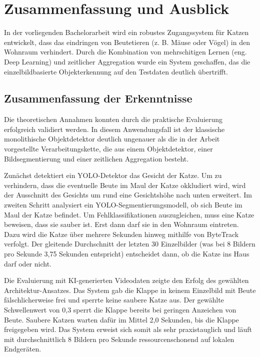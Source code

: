 \chapter{Zusammenfassung und Ausblick}
\label{sec:zusammenfassung}

In der vorliegenden Bachelorarbeit wird ein robustes Zugangssystem für Katzen entwickelt, dass das eindringen von Beutetieren (z. B. Mäuse oder Vögel) in den Wohnraum verhindert. Durch die Kombination von mehrschitigen Lernen (eng. Deep Learning) und zeitlicher Aggregation wurde ein System geschaffen, das die einzelbildbasierte Objekterkennung auf den Testdaten deutlich übertrifft.

\section{Zusammenfassung der Erkenntnisse}
\label{subsec:zusammenfassung_erkenntnisse}

Die theoretischen Annahmen konnten durch die praktische Evaluierung erfolgreich validiert werden. In diesem Anwendungsfall ist der klassische monolithische Objektdetektor deutlich ungenauer als die in der Arbeit vorgestellte Verarbeitungskette, die aus einem Objektdetektor, einer Bildsegmentierung und einer zeitlichen Aggregation besteht.

Zunächst detektiert ein YOLO-Detektor das Gesicht der Katze. Um zu verhindern, dass die eventuelle Beute im Maul der Katze okkludiert wird, wird der Ausschnitt des Gesichts um rund eine Gesichtshöhe nach unten erweitert. Im zweiten Schritt analysiert ein YOLO-Segmentierungsmodell, ob sich Beute im Maul der Katze befindet. Um Fehlklassifikationen auszugleichen, muss eine Katze beweisen, dass sie sauber ist. Erst dann darf sie in den Wohnraum eintreten. Dazu wird die Katze über mehrere Sekunden hinweg mithilfe von ByteTrack verfolgt. Der gleitende Durchschnitt der letzten 30 Einzelbilder (was bei 8 Bildern pro Sekunde 3,75 Sekunden entspricht) entscheidet dann, ob die Katze ins Haus darf oder nicht.

Die Evaluierung mit KI-generierten Videodaten zeigte den Erfolg des gewählten Architektur-Ansatzes. Das System gab die Klappe in keinem Einzelbild mit Beute fälschlicherweise frei und sperrte keine saubere Katze aus. Der gewählte Schwellenwert von 0,3 sperrt die Klappe bereits bei geringen Anzeichen von Beute. Saubere Katzen warten dafür im Mittel 2,0 Sekunden, bis die Klappe freigegeben wird. Das System erweist sich somit als sehr praxistauglich und läuft mit durchschnittlich 8 Bildern pro Sekunde ressourcenschonend auf lokalen Endgeräten.

